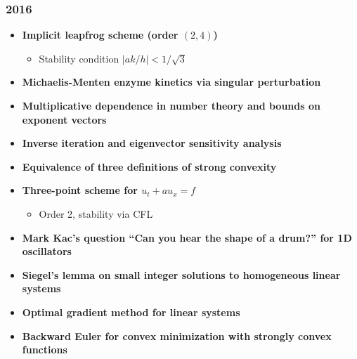 \subsubsection*{2016}
\begin{itemize}
    \item \textbf{Implicit leapfrog scheme (order $(2,4)$)}
        \begin{itemize}
            \item Stability condition $|ak/h| < 1/\sqrt{3}$
        \end{itemize}
    \item \textbf{Michaelis-Menten enzyme kinetics via singular perturbation}
    \item \textbf{Multiplicative dependence in number theory and bounds on exponent vectors}
    \item \textbf{Inverse iteration and eigenvector sensitivity analysis}
    \item \textbf{Equivalence of three definitions of strong convexity}
    \item \textbf{Three-point scheme for $u_t + au_x = f$}
        \begin{itemize}
            \item Order 2, stability via CFL
        \end{itemize}
    \item \textbf{Mark Kac's question ``Can you hear the shape of a drum?'' for 1D oscillators}
    \item \textbf{Siegel's lemma on small integer solutions to homogeneous linear systems}
    \item \textbf{Optimal gradient method for linear systems}
    \item \textbf{Backward Euler for convex minimization with strongly convex functions}
\end{itemize}

